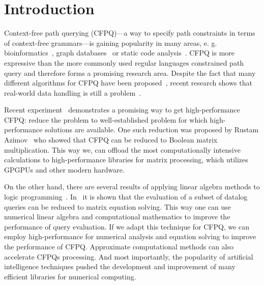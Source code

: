 \documentclass[sigconf]{acmart}
\begin{document}



\maketitle

\section{Introduction}

Context-free path querying (CFPQ)---a way to specify path constraints in terms of context-free grammars---is gaining popularity in many areas, e. g. bioinformatics~\cite{sevon2008subgraph}, graph databases~\cite{yannakakis1990graph,Medeiros:2018:EEC:3167132.3167265,Kuijpers:2019:ESC:3335783.3335791} or static code analysis~\cite{Reps,zhang2013fast}.
CFPQ is more expressive than the more commonly used regular languages constrained path query and therefore forms a promising research area.
Despite the fact that many different algorithms for CFPQ have been proposed~\cite{RDF,Medeiros:2018:EEC:3167132.3167265,azimov2018context,Verbitskaia:2018:PCC:3241653.3241655,10.1007/978-3-319-91662-0_17}, recent research shows that real-world data handling is still a problem~\cite{Kuijpers:2019:ESC:3335783.3335791}.

Recent experiment~\cite{mishin2019evaluation} demonstrates a promising way to get high-performance CFPQ: reduce the problem to well-established problem for which high-performance solutions are available.
One such reduction was proposed by Rustam Azimov~\cite{azimov2018context} who showed that CFPQ can be reduced to Boolean matrix multiplication.
This way we, can offload the most computationally intensive calculations to high-performance libraries for matrix processing, which utilizes GPGPUs and other modern hardware.

On the other hand, there are several results of applying linear algebra methods to logic programming~\cite{sato2017linear, aspis2018linear}.
In~\cite{sato2017linear} it is shown that the evaluation of a subset of datalog queries can be reduced to matrix equation solving.
This way one can use numerical linear algebra and computational mathematics to improve the performance of query evaluation.
If we adapt this technique for CFPQ, we can employ high-performance for numerical analysis and equation solving to improve the performance of CFPQ.
Approximate computational methods can also accelerate CFPQs processing.
And most importantly, the popularity of artificial intelligence techniques pushed the development and improvement of many efficient libraries for numerical computing.
\end{document}
